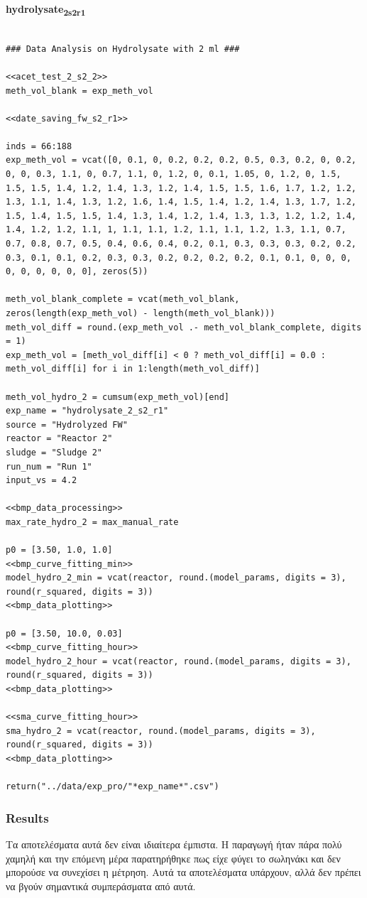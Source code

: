 \documentclass[11pt]{article}
\begin{document}
\textbf{hydrolysate\textsubscript{2}\textsubscript{s2}\textsubscript{r1}}
\begin{verbatim}

### Data Analysis on Hydrolysate with 2 ml ###

<<acet_test_2_s2_2>>
meth_vol_blank = exp_meth_vol

<<date_saving_fw_s2_r1>>

inds = 66:188
exp_meth_vol = vcat([0, 0.1, 0, 0.2, 0.2, 0.2, 0.5, 0.3, 0.2, 0, 0.2, 0, 0, 0.3, 1.1, 0, 0.7, 1.1, 0, 1.2, 0, 0.1, 1.05, 0, 1.2, 0, 1.5, 1.5, 1.5, 1.4, 1.2, 1.4, 1.3, 1.2, 1.4, 1.5, 1.5, 1.6, 1.7, 1.2, 1.2, 1.3, 1.1, 1.4, 1.3, 1.2, 1.6, 1.4, 1.5, 1.4, 1.2, 1.4, 1.3, 1.7, 1.2, 1.5, 1.4, 1.5, 1.5, 1.4, 1.3, 1.4, 1.2, 1.4, 1.3, 1.3, 1.2, 1.2, 1.4, 1.4, 1.2, 1.2, 1.1, 1, 1.1, 1.1, 1.2, 1.1, 1.1, 1.2, 1.3, 1.1, 0.7, 0.7, 0.8, 0.7, 0.5, 0.4, 0.6, 0.4, 0.2, 0.1, 0.3, 0.3, 0.3, 0.2, 0.2, 0.3, 0.1, 0.1, 0.2, 0.3, 0.3, 0.2, 0.2, 0.2, 0.2, 0.1, 0.1, 0, 0, 0, 0, 0, 0, 0, 0, 0], zeros(5))

meth_vol_blank_complete = vcat(meth_vol_blank, zeros(length(exp_meth_vol) - length(meth_vol_blank)))
meth_vol_diff = round.(exp_meth_vol .- meth_vol_blank_complete, digits = 1)
exp_meth_vol = [meth_vol_diff[i] < 0 ? meth_vol_diff[i] = 0.0 : meth_vol_diff[i] for i in 1:length(meth_vol_diff)]

meth_vol_hydro_2 = cumsum(exp_meth_vol)[end]
exp_name = "hydrolysate_2_s2_r1"
source = "Hydrolyzed FW"
reactor = "Reactor 2"
sludge = "Sludge 2"
run_num = "Run 1"
input_vs = 4.2

<<bmp_data_processing>>
max_rate_hydro_2 = max_manual_rate

p0 = [3.50, 1.0, 1.0]
<<bmp_curve_fitting_min>>
model_hydro_2_min = vcat(reactor, round.(model_params, digits = 3), round(r_squared, digits = 3))
<<bmp_data_plotting>>

p0 = [3.50, 10.0, 0.03]
<<bmp_curve_fitting_hour>>
model_hydro_2_hour = vcat(reactor, round.(model_params, digits = 3), round(r_squared, digits = 3))
<<bmp_data_plotting>>

<<sma_curve_fitting_hour>>
sma_hydro_2 = vcat(reactor, round.(model_params, digits = 3), round(r_squared, digits = 3))
<<bmp_data_plotting>>

return("../data/exp_pro/"*exp_name*".csv")
\end{verbatim}

\subsubsection{Results}
\label{sec:orgb71cf77}
Τα αποτελέσματα αυτά δεν είναι ιδιαίτερα έμπιστα. Η παραγωγή ήταν πάρα πολύ χαμηλή και την επόμενη μέρα παρατηρήθηκε πως είχε φύγει το σωληνάκι και δεν μπορούσε να συνεχίσει η μέτρηση. Αυτά τα αποτελέσματα υπάρχουν, αλλά δεν πρέπει να βγούν σημαντικά συμπεράσματα από αυτά.
\end{document}
